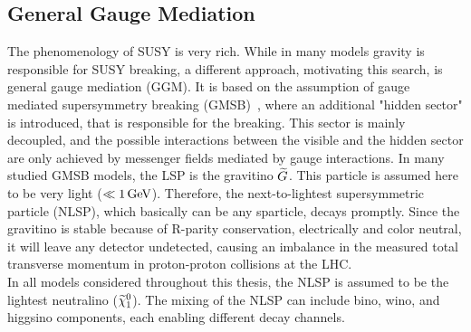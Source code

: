 \begin{enumerate}
\subsection{General Gauge Mediation}\label{sec:GGM}
The phenomenology of SUSY is very rich. While in many models gravity is responsible for SUSY breaking, a different approach, motivating this search, is general gauge mediation (GGM). It is based on the assumption of gauge mediated supersymmetry breaking (GMSB)~\cite{GGM}, where an additional "hidden sector" is introduced, that is responsible for the breaking. This sector is mainly decoupled, and the possible interactions between the visible and the hidden sector are only achieved by messenger fields mediated by gauge interactions. In many studied GMSB models, the LSP is the gravitino $\widetilde{G}$. This particle is assumed here to be very light ($\ll1\,\text{Ge\hspace{-.08em}V}$). Therefore, the next-to-lightest supersymmetric particle (NLSP), which basically can be any sparticle, decays promptly. Since the gravitino is stable because of R-parity conservation, electrically and color neutral, it will leave any detector undetected, causing an imbalance in the measured total transverse momentum in proton-proton collisions at the LHC.\\
In all models considered throughout this thesis, the NLSP is assumed to be the lightest neutralino ($\widetilde{\chi}^{0}_{1}$). The mixing of the NLSP can include bino, wino, and higgsino components, each enabling different decay channels.



\end{enumerate}
